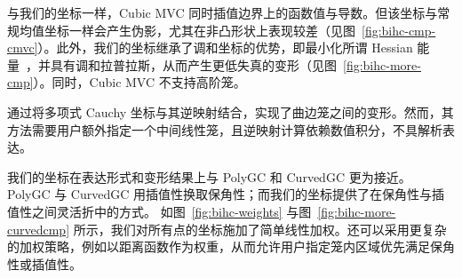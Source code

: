 与我们的坐标一样，Cubic MVC 同时插值边界上的函数值与导数。但该坐标与常规均值坐标一样会产生伪影，尤其在非凸形状上表现较差（见图~\ref{fig:bihc-cmp-cmvc}）。此外，我们的坐标继承了调和坐标的优势，即最小化所谓 Hessian 能量~\cite{Stein2018NaturalBC}，并具有调和拉普拉斯，从而产生更低失真的变形（见图~\ref{fig:bihc-more-cmp}）。同时，Cubic MVC 不支持高阶笼。

\cite{Lin2024PolynomialCC} 通过将多项式 Cauchy 坐标与其逆映射结合，实现了曲边笼之间的变形。然而，其方法需要用户额外指定一个中间线性笼，且逆映射计算依赖数值积分，不具解析表达。

我们的坐标在表达形式和变形结果上与 PolyGC 和 CurvedGC 更为接近。
PolyGC 与 CurvedGC 用插值性换取保角性；而我们的坐标提供了在保角性与插值性之间灵活折中的方式。
如图~\ref{fig:bihc-weights} 与图~\ref{fig:bihc-more-curvedcmp} 所示，我们对所有点的坐标施加了简单线性加权。还可以采用更复杂的加权策略，例如以距离函数作为权重，从而允许用户指定笼内区域优先满足保角性或插值性。
